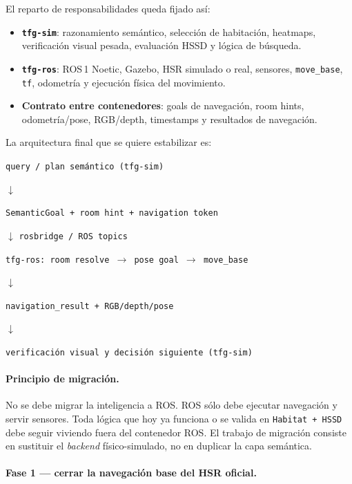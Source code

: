 \documentclass[11pt,a4paper]{article}
\begin{document}
El reparto de responsabilidades queda fijado así:

\begin{itemize}
  \item \textbf{\texttt{tfg-sim}}: razonamiento semántico, selección de
        habitación, heatmaps, verificación visual pesada, evaluación HSSD y
        lógica de búsqueda.
  \item \textbf{\texttt{tfg-ros}}: ROS\,1 Noetic, Gazebo, HSR simulado o real,
        sensores, \texttt{move\_base}, \texttt{tf}, odometría y ejecución física
        del movimiento.
  \item \textbf{Contrato entre contenedores}: goals de navegación, room hints,
        odometría/pose, RGB/depth, timestamps y resultados de navegación.
\end{itemize}

La arquitectura final que se quiere estabilizar es:

\begin{center}
\texttt{query / plan semántico (tfg-sim)}

$\downarrow$

\texttt{SemanticGoal + room hint + navigation token}

$\downarrow$ \texttt{rosbridge / ROS topics}

\texttt{tfg-ros: room resolve $\rightarrow$ pose goal $\rightarrow$ move\_base}

$\downarrow$

\texttt{navigation\_result + RGB/depth/pose}

$\downarrow$

\texttt{verificación visual y decisión siguiente (tfg-sim)}
\end{center}

\paragraph{Principio de migración.}

No se debe migrar la inteligencia a ROS. ROS sólo debe ejecutar navegación y
servir sensores. Toda lógica que hoy ya funciona o se valida en
\texttt{Habitat + HSSD} debe seguir viviendo fuera del contenedor ROS. El
trabajo de migración consiste en sustituir el \emph{backend} físico-simulado,
no en duplicar la capa semántica.

\paragraph{Fase 1 --- cerrar la navegación base del HSR oficial.}
\end{document}
